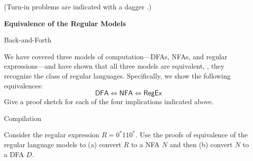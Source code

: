 \documentclass[11pt]{book}
\newcommand{\doctitle}{Equivalence of the Regular Models}
\begin{document}
\begin{center}
  (Turn-in problems are indicated with a dagger \turninproblem{}.)
\end{center}

\begin{center}
  \large\textbf{{\doctitle}}
\end{center}

\vspace{2em}


\begin{problem}{Back-and-Forth}

We have covered three models of computation---DFAs, NFAs, and regular expressions---and have shown that all three models are equivalent, \ie, they recognize the class of regular languages.
Specifically, we show the following equivalences:
\[
  \mathsf{DFA} \Leftrightarrow \mathsf{NFA} \Leftrightarrow \mathsf{RegEx}
\]
Give a proof sketch for each of the four implications indicated above.

\end{problem}

\newpage

\begin{problem}{Compilation}

Consider the regular expression \( R = 0^* 11 0^* \).
Use the proofs of equivalence of the regular language models to (a) convert \( R \) to a NFA \( N \) and then (b) convert \( N \) to a DFA \( D \).

\end{problem}
\end{document}
